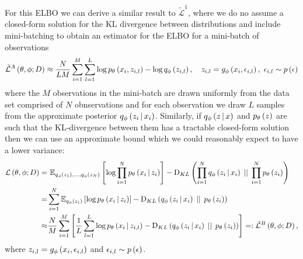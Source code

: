 \documentclass[../report.tex]{subfiles}
\begin{document}
For this ELBO we can derive a similar result to $\tilde{\mathcal{L}}^1$, where we do no assume a closed-form solution for the KL divergence between distributions and include mini-batching to obtain an estimator for the ELBO for a mini-batch of observations
\begin{equation}
  \tilde{\mathcal{L}}^A \left( \theta, \phi; D\right) \approx \frac{N}{LM} \sum_{i=1}^{M} \sum_{l=1}^{L} \log p_\theta \left( x_i, z_{i,l}\right) - \log q_\phi \left( z_{i,l}\right), \quad z_{i,l} = g_\phi \left( x_i, \epsilon_{i,l}\right),\,\, \epsilon_{i,l} \sim p \left( \epsilon\right)
\end{equation}
where the $M$ observations in the mini-batch are drawn uniformly from the data set comprised of $N$ obnservations and for each observation we draw $L$ samples from the approximate posterior $q_\phi \left(z_i \, \middle\vert \, x_i \right)$.
Similarly, if $q_\phi \left(z \, \middle\vert \, x \right)$ and $p_\theta \left( z\right)$ are such that the KL-divergence between them has a tractable closed-form solution then we can use an approximate bound which we could reasonably expect to have a lower variance:
\begin{align}
  \mathcal{L} \left( \theta, \phi; D\right) =& \,\,\mathbb{E}_{q_\phi \left( z_1\right),...,q_\phi \left( z_N\right)} \left[ \log \prod_{i=1}^{N} p_\theta \left(x_i \, \middle\vert \, z_i \right) \right] - \textrm{D}_{KL} \left( \prod_{i=1}^{N} q_\phi \left(z_i \, \middle\vert \, x_i \right) \, \mid \mid \, \prod_{i=1}^{N} p_\theta \left( z_i\right)\right) \nonumber \\
  =& \sum_{i=1}^{N} \mathbb{E}_{q_\phi \left( z_i\right)} \left[ \log p_\theta \left(x_i \, \middle\vert \, z_i \right) \right] - \textrm{D}_{KL} \left( q_\phi \left(z_i \, \middle\vert \, x_i \right) \, \mid \mid \, p_\theta \left( z_i\right)\right) \nonumber \\
  \approx& \frac{N}{M} \sum_{i=1}^{M} \left[ \frac{1}{L} \sum_{l=1}^{L} \log p_\theta \left(x_i \, \middle\vert \, z_{i,l} \right) - \textrm{D}_{KL} \left( q_{\phi} \left(z_i \, \middle\vert \, x_i \right) \, \mid \mid \, p_\theta \left( z_i\right)\right) \right] =: \tilde{\mathcal{L}}^B \left( \theta, \phi; D\right),
\end{align}
where $z_{i,l} = g_\phi \left( x_i, \epsilon_{i,l}\right)$ and $\epsilon_{i,l} \sim p \left( \epsilon\right)$.
\end{document}
